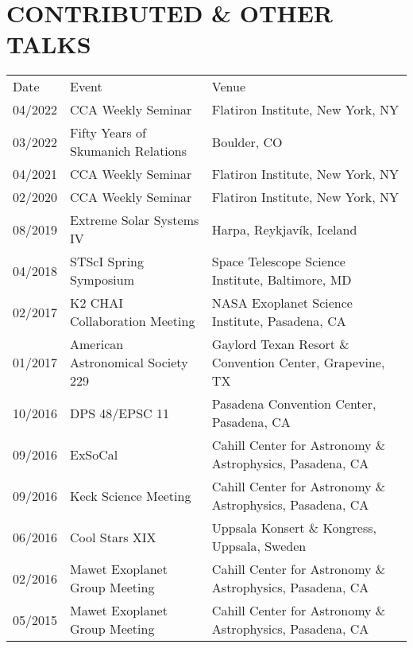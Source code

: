 \section{\large CONTRIBUTED \& OTHER TALKS}
\begin{tabular}{lll}
{\sc  Date}  & {\sc  Event} & {\sc  Venue} \\
04/2022 & CCA Weekly Seminar & Flatiron Institute, New York, NY\\
03/2022 & Fifty Years of Skumanich Relations & Boulder, CO \\
04/2021 & CCA Weekly Seminar & Flatiron Institute, New York, NY\\
02/2020 & CCA Weekly Seminar & Flatiron Institute, New York, NY\\
08/2019 & Extreme Solar Systems IV & Harpa, Reykjav\'{i}k, Iceland \\ %
04/2018 & STScI Spring Symposium & Space Telescope Science Institute, Baltimore, MD \\ %
02/2017 & K2 CHAI Collaboration Meeting & NASA Exoplanet Science Institute, Pasadena, CA \\
01/2017 & American Astronomical Society 229 & Gaylord Texan Resort \& Convention Center, Grapevine, TX \\
10/2016 & DPS 48/EPSC 11 & Pasadena Convention Center, Pasadena, CA \\
09/2016 & ExSoCal & Cahill Center for Astronomy \& Astrophysics, Pasadena, CA \\
09/2016 & Keck Science Meeting & Cahill Center for Astronomy \& Astrophysics, Pasadena, CA \\
06/2016 & Cool Stars XIX & Uppsala Konsert \& Kongress, Uppsala, Sweden \\
02/2016 & Mawet Exoplanet Group Meeting & Cahill Center for Astronomy \& Astrophysics, Pasadena, CA \\
05/2015 & Mawet Exoplanet Group Meeting & Cahill Center for Astronomy \& Astrophysics, Pasadena, CA \\
\end{tabular}
